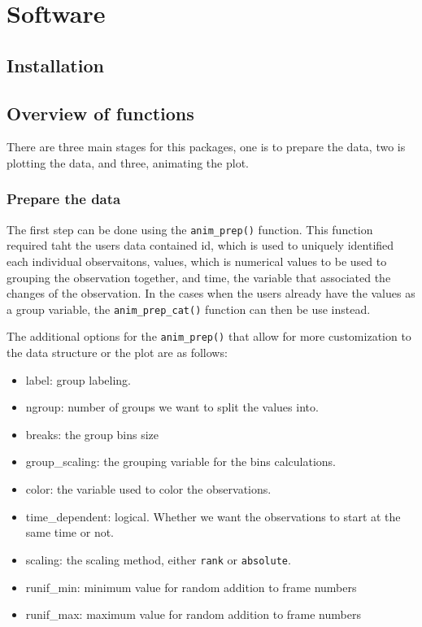 \hypertarget{software}{%
\section{Software}\label{software}}

\hypertarget{installation}{%
\subsection{Installation}\label{installation}}

\hypertarget{overview-of-functions}{%
\subsection{Overview of functions}\label{overview-of-functions}}

There are three main stages for this packages, one is to prepare the data, two is plotting the data, and three, animating the plot.

\hypertarget{prepare-the-data}{%
\subsubsection{Prepare the data}\label{prepare-the-data}}

The first step can be done using the \texttt{anim\_prep()} function. This function required taht the users data contained id, which is used to uniquely identified each individual observaitons, values, which is numerical values to be used to grouping the observation together, and time, the variable that associated the changes of the observation. In the cases when the users already have the values as a group variable, the \texttt{anim\_prep\_cat()} function can then be use instead.

The additional options for the \texttt{anim\_prep()} that allow for more customization to the data structure or the plot are as follows:

\begin{itemize}
\tightlist
\item
  label: group labeling.
\item
  ngroup: number of groups we want to split the values into.
\item
  breaks: the group bins size
\item
  group\_scaling: the grouping variable for the bins calculations.
\item
  color: the variable used to color the observations.
\item
  time\_dependent: logical. Whether we want the observations to start at the same time or not.
\item
  scaling: the scaling method, either \texttt{rank} or \texttt{absolute}.
\item
  runif\_min: minimum value for random addition to frame numbers
\item
  runif\_max: maximum value for random addition to frame numbers
\end{itemize}

